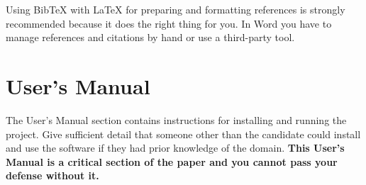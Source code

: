 \documentclass[acmlarge,screen]{acmart}
\begin{document}
Using BibTeX with LaTeX for preparing and formatting references 
is strongly recommended because it does the right thing for you.
In Word you have to manage references and citations by hand or use 
a third-party tool.




\appendix

\section{User's Manual}
The User’s Manual section contains instructions for installing and running the project. Give sufficient detail that someone other than the candidate could install and use the software if they had prior knowledge of the domain.  \textbf{This User's Manual is a critical section of the paper and you cannot pass your defense without it.}
\end{document}
